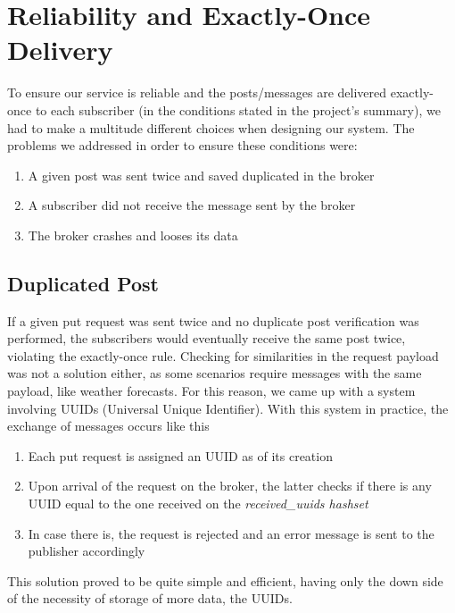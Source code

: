 \section{Reliability and Exactly-Once Delivery}
\label{sec:Reliability}


To ensure our service is reliable and the posts/messages are delivered exactly-once to each subscriber (in the conditions stated in the project's summary), we had to make a multitude different choices when designing our system. The problems we addressed in order to ensure these conditions were:

\begin{enumerate}
    \item A given post was sent twice and saved duplicated in the broker
    \item A subscriber did not receive the message sent by the broker
    \item The broker crashes and looses its data
\end{enumerate}

\subsection{Duplicated Post}

If a given put request was sent twice and no duplicate post verification was performed, the subscribers would eventually receive the same post twice, violating the exactly-once rule. Checking for similarities in the request payload was not a solution either, as some scenarios require messages with the same payload, like weather forecasts. For this reason, we came up with a system involving UUIDs (Universal Unique Identifier). With this system in practice, the exchange of messages occurs like this

\begin{enumerate}
    \item Each put request is assigned an UUID as of its creation
    \item Upon arrival of the request on the broker, the latter checks if there is any UUID equal to the one received on the \emph{received\_uuids hashset}
    \item In case there is, the request is rejected and an error message is sent to the publisher accordingly
\end{enumerate}

This solution proved to be quite simple and efficient, having only the down side of the necessity of storage of more data, the UUIDs.

